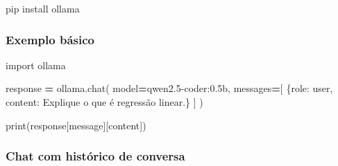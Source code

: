 \documentclass[
]{article}
\newenvironment{Shaded}{\begin{snugshade}}{\end{snugshade}}
\newcommand{\BuiltInTok}[1]{#1}
\newcommand{\ExtensionTok}[1]{#1}
\newcommand{\ImportTok}[1]{#1}
\newcommand{\NormalTok}[1]{#1}
\newcommand{\OperatorTok}[1]{\textcolor[rgb]{0.81,0.36,0.00}{\textbf{#1}}}
\newcommand{\StringTok}[1]{\textcolor[rgb]{0.31,0.60,0.02}{#1}}
\begin{document}
\begin{Shaded}
\begin{Highlighting}[]
\ExtensionTok{pip}\NormalTok{ install ollama}
\end{Highlighting}
\end{Shaded}

\subsubsection{Exemplo básico}\label{exemplo-buxe1sico}

\begin{Shaded}
\begin{Highlighting}[]
\ImportTok{import}\NormalTok{ ollama}

\NormalTok{response }\OperatorTok{=}\NormalTok{ ollama.chat(}
\NormalTok{    model}\OperatorTok{=}\StringTok{\textquotesingle{}qwen2.5{-}coder:0.5b\textquotesingle{}}\NormalTok{,}
\NormalTok{    messages}\OperatorTok{=}\NormalTok{[}
\NormalTok{        \{}\StringTok{\textquotesingle{}role\textquotesingle{}}\NormalTok{: }\StringTok{\textquotesingle{}user\textquotesingle{}}\NormalTok{, }\StringTok{\textquotesingle{}content\textquotesingle{}}\NormalTok{: }\StringTok{\textquotesingle{}Explique o que é regressão linear.\textquotesingle{}}\NormalTok{\}}
\NormalTok{    ]}
\NormalTok{)}

\BuiltInTok{print}\NormalTok{(response[}\StringTok{\textquotesingle{}message\textquotesingle{}}\NormalTok{][}\StringTok{\textquotesingle{}content\textquotesingle{}}\NormalTok{])}
\end{Highlighting}
\end{Shaded}

\subsubsection{Chat com histórico de
conversa}\label{chat-com-histuxf3rico-de-conversa}
\end{document}
